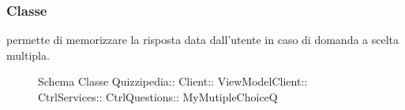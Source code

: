 \subsubsection{Classe }
permette di memorizzare la risposta data dall'utente in caso di domanda a scelta multipla.
\begin{figure}[H]
\centering
\noindent{}
\caption[Schema Classe MyMutipleChoiceQ]{Schema Classe Quizzipedia:: Client:: ViewModelClient:: CtrlServices:: CtrlQuestions:: MyMutipleChoiceQ}
\end{figure}
